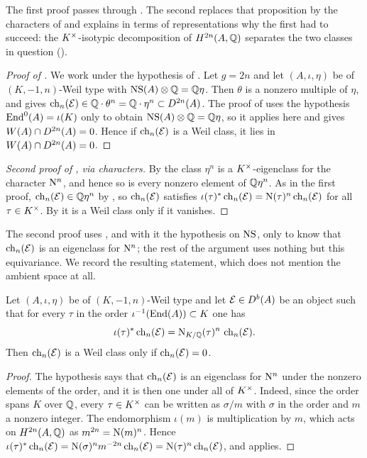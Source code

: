 The first proof passes through . The second replaces that
proposition by the characters of  and explains in terms
of representations why the first had to succeed: the $K^{\times}$-isotypic
decomposition of $H^{2n}(A,\mathbb{Q})$ separates the two classes in question
().

\begin{proof}[Proof of ]
We work under the hypothesis of . Let $g=2n$ and let
$(A,\iota,\eta)$ be of $(K,-1,n)$-Weil type with
$\mathrm{NS}(A)\otimes\mathbb{Q}=\mathbb{Q}\eta$. Then $\theta$ is a nonzero multiple of $\eta$,
and  gives
$\operatorname{ch}_{n}(\mathcal{E})\in\mathbb{Q}\cdot\theta^{n}=\mathbb{Q}\cdot\eta^{n}\subset D^{2n}(A)$. The
proof of  uses the hypothesis $\operatorname{End}^{0}(A)=\iota(K)$ only
to obtain $\mathrm{NS}(A)\otimes\mathbb{Q}=\mathbb{Q}\eta$, so it applies here and gives
$W(A)\cap D^{2n}(A)=0$. Hence if $\operatorname{ch}_{n}(\mathcal{E})$ is a Weil class, it lies in
$W(A)\cap D^{2n}(A)=0$.
\end{proof}

\begin{proof}[Second proof of , via characters]
By  the class $\eta^{n}$ is a $K^{\times}$-eigenclass for the
character $\mathrm{N}^{n}$, and hence so is every nonzero element of $\mathbb{Q}\eta^{n}$.
As in the first proof, $\operatorname{ch}_{n}(\mathcal{E})\in\mathbb{Q}\eta^{n}$ by
, so $\operatorname{ch}_{n}(\mathcal{E})$ satisfies
$\iota(\tau)^{*}\operatorname{ch}_{n}(\mathcal{E})=\mathrm{N}(\tau)^{n}\operatorname{ch}_{n}(\mathcal{E})$ for all $\tau\in K^{\times}$.
By  it is a Weil class only if it vanishes.
\end{proof}

The second proof uses , and with it the hypothesis on
$\mathrm{NS}$, only to know that $\operatorname{ch}_{n}(\mathcal{E})$ is an eigenclass for $\mathrm{N}^{n}$; the
rest of the argument uses nothing but this equivariance. We record the
resulting statement, which does not mention the ambient space at all.

\begin{theorem}\label{thm:equivsuffices}
Let $(A,\iota,\eta)$ be of $(K,-1,n)$-Weil type and let $\mathcal{E}\in D^{b}(A)$ be
an object such that for every $\tau$ in the order
$\iota^{-1}(\operatorname{End}(A))\subset K$ one has
\[
  \iota(\tau)^{*}\operatorname{ch}_{n}(\mathcal{E})=\mathrm{N}_{K/\mathbb{Q}}(\tau)^{n}\,\operatorname{ch}_{n}(\mathcal{E}).
\]
Then $\operatorname{ch}_{n}(\mathcal{E})$ is a Weil class only if $\operatorname{ch}_{n}(\mathcal{E})=0$.
\end{theorem}

\begin{proof}
The hypothesis says that $\operatorname{ch}_{n}(\mathcal{E})$ is an eigenclass for $\mathrm{N}^{n}$ under
the nonzero elements of the order, and it is then one under all of $K^{\times}$.
Indeed, since the order spans $K$ over $\mathbb{Q}$, every $\tau\in K^{\times}$ can be
written as $\sigma/m$ with $\sigma$ in the order and $m$ a nonzero integer.
The endomorphism $\iota(m)$ is multiplication by $m$, which acts on
$H^{2n}(A,\mathbb{Q})$ as $m^{2n}=\mathrm{N}(m)^{n}$. Hence
$\iota(\tau)^{*}\operatorname{ch}_{n}(\mathcal{E})=\mathrm{N}(\sigma)^{n}m^{-2n}\operatorname{ch}_{n}(\mathcal{E})
=\mathrm{N}(\tau)^{n}\operatorname{ch}_{n}(\mathcal{E})$, and  applies.
\end{proof}

